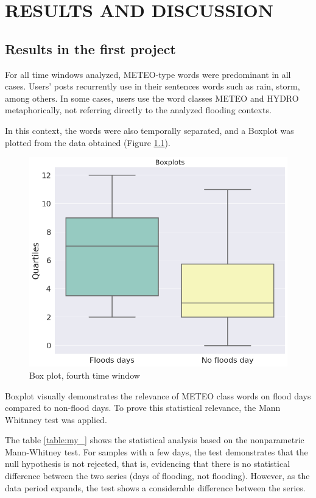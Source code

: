 
\chapter{RESULTS AND DISCUSSION} \label{MatMet}
\section{Results in  the first project }
For all time windows analyzed, METEO-type words were predominant in all cases. Users' posts recurrently use in their sentences words such as rain, storm, among others. In some cases, users use the word classes METEO and HYDRO metaphorically, not referring directly to the analyzed flooding contexts.

In this context, the words were also temporally separated, and a Boxplot was plotted from the data obtained (Figure \ref{fig:my=bel}).

\begin{figure}[H]
	\centering
	\includegraphics[scale=0.5]{figs/boxplot2.png}
	\caption{Box plot, fourth time window}
	\label{fig:my=bel}
\end{figure}

Boxplot visually demonstrates the relevance of METEO class words on flood days compared to non-flood days. To prove this statistical relevance, the Mann Whitnney test was applied. 

The table \ref{table:my_} shows the statistical analysis based on the nonparametric Mann-Whitney test. For samples with a few days, the test demonstrates that the null hypothesis is not rejected, that is, evidencing that there is no statistical difference between the two series (days of flooding, not flooding). However, as the data period expands, the test shows a considerable difference between the series.

